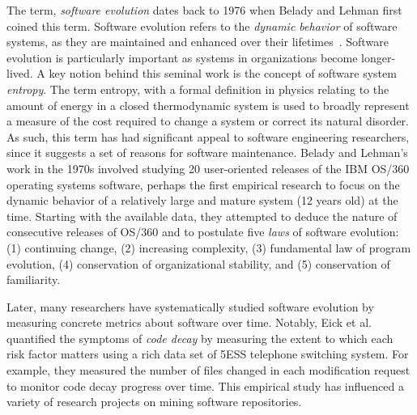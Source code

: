 \documentclass[runningheads,a4paper]{llncs}
\begin{document}
The term, {\em software evolution} dates back to 1976 when Belady and Lehman first coined this term. Software evolution refers to the {\em dynamic behavior} of software systems, as they are maintained and enhanced over their lifetimes~\cite{Belady1976:ModelEvolution}. Software evolution is particularly important as systems in organizations become longer-lived. %
A key notion behind this seminal work is the concept of software system {\em entropy}. The term entropy, with a formal definition in physics relating to the amount of energy in a closed thermodynamic system is used to broadly represent a measure of the cost required to change a system or correct its natural disorder. As such, this term has had significant appeal to software engineering researchers, since it suggests a set of reasons for software maintenance. Belady and Lehman's work in the 1970s involved studying 20 user-oriented releases of the IBM OS/360 operating systems software, perhaps the first empirical research to focus on the dynamic behavior of a relatively large and mature system (12 years old) at the time. Starting with the available data, they attempted to deduce the nature of consecutive releases of OS/360 and to postulate five {\em laws} of software evolution: (1) continuing change, (2) increasing complexity, (3) fundamental law of program evolution, (4) conservation of organizational stability, and (5) conservation of familiarity. 

Later, many researchers have systematically studied software evolution by measuring concrete metrics about software over time. 
Notably, Eick et al.\cite{Eick2001:CodeDecay} quantified the symptoms of {\em code decay} by measuring the extent to which each risk factor matters using a rich data set of 5ESS telephone switching system. For example, they measured the number of files changed in each modification request to monitor code decay progress over time. This empirical study has influenced a variety of research projects on mining software repositories.  %
\end{document}
